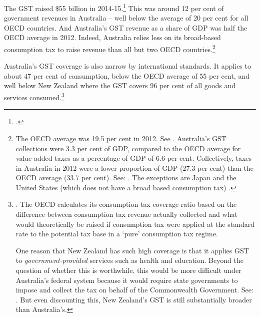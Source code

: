 The GST raised \$55 billion in 2014-15.\footcite[][5]{Treasury2015FinalBudgetOutcome1415}  This was around 12 per cent of government revenues in Australia – well below the average of 20 per cent for all OECD countries.  And Australia’s GST revenue as a share of GDP was half the OECD average in 2012. Indeed, Australia relies less on its broad-based consumption tax to raise revenue than all but two OECD countries.\footnote{The OECD average was 19.5 per cent in 2012. See \textcite{OECD2014}. Australia’s GST collections were 3.3 per cent of GDP, compared to the OECD average for value added taxes as a percentage of GDP of 6.6 per cent. Collectively, taxes in Australia in 2012 were a lower proportion of GDP (27.3 per cent) than the OECD average (33.7 per cent). See: \textcite{OECD2015b}.
The exceptions are Japan and the United States (which does not have a broad based consumption tax) \textcite[][40]{OECD2014}.}

Australia’s GST coverage is also narrow by international standards. It applies to about 47 per cent of consumption, below the OECD average of 55 per cent,   and well below New Zealand where the GST covers 96 per cent of all goods and services consumed.\footnote{\textcite[][95]{OECD2014}. The OECD calculates its consumption tax coverage ratio based on the difference between consumption tax revenue actually collected and what would theoretically be raised if consumption tax were applied at the standard rate to the potential tax base in a ‘pure’ consumption tax regime.

One reason that New Zealand has such high coverage is that it applies GST to \emph{government-provided} services such as health and education. Beyond the question of whether this is worthwhile, this would be more difficult under Australia’s federal system because it would require state governments to impose and collect the tax on behalf of the Commonwealth Government. See: \textcite{Millar2015}. But even discounting this, New Zealand’s GST is still substantially broader than Australia’s.}  

